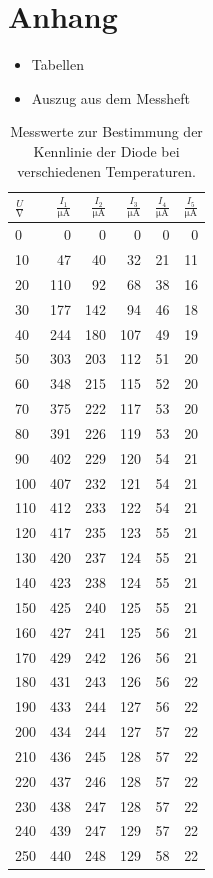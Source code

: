 \documentclass[11pt,ngerman,a4paper]{article}
\begin{document}
\section{Anhang}
\begin{itemize}
\item Tabellen
\item Auszug aus dem Messheft
\end{itemize}
\newpage


\begin{table}
\centering
\begin{tabular}{l|rrrrr}
\toprule
$\frac{U}{\si{\volt}} $&$\frac {I_1}{\si{\micro\ampere}}$&$\frac {I_2}{\si{\micro\ampere}}$ &$\frac {I_3}{\si{\micro\ampere}}$&$\frac {I_4}{\si{\micro\ampere}}$&$\frac {I_5}{\si{\micro\ampere}}$\\
\midrule
0 & 0 & 0 & 0 & 0 & 0\\
10 & 47 & 40 & 32 & 21 & 11\\
20 & 110 & 92 & 68 & 38 & 16\\
30 & 177 & 142 & 94 & 46 & 18\\
40 & 244 & 180 & 107 & 49 & 19\\
50 & 303 & 203 & 112 & 51 & 20\\
60 & 348 & 215 & 115 & 52 & 20\\
70 & 375 & 222 & 117 & 53 & 20\\
80 & 391 & 226 & 119 & 53 & 20\\
90 & 402 & 229 & 120 & 54 & 21\\
100 & 407 & 232 & 121 & 54 & 21\\
110 & 412 & 233 & 122 & 54 & 21\\
120 & 417 & 235 & 123 & 55 & 21\\
130 & 420 & 237 & 124 & 55 & 21\\
140 & 423 & 238 & 124 & 55 & 21\\
150 & 425 & 240 & 125 & 55 & 21\\
160 & 427 & 241 & 125 & 56 & 21\\
170 & 429 & 242 & 126 & 56 & 21\\
180 & 431 & 243 & 126 & 56 & 22\\
190 & 433 & 244 & 127 & 56 & 22\\
200 & 434 & 244 & 127 & 57 & 22\\
210 & 436 & 245 & 128 & 57 & 22\\
220 & 437 & 246 & 128 & 57 & 22\\
230 & 438 & 247 & 128 & 57 & 22\\
240 & 439 & 247 & 129 & 57 & 22\\
250 & 440 & 248 & 129 & 58 & 22\\
\bottomrule
\end{tabular}

\caption{Messwerte zur Bestimmung der Kennlinie der Diode bei verschiedenen Temperaturen.}
\label{tab_a}
\end{table}
\end{document}
